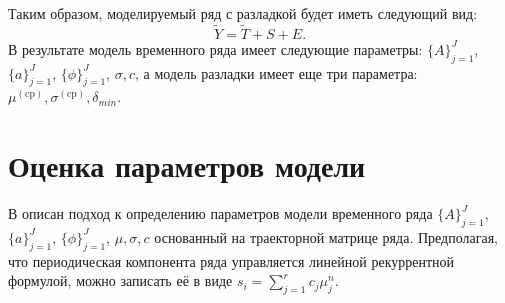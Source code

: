 \documentclass[%
12pt,
master,  %
natbib,      %
subf,        %
substylefile = spbu.rtx,
href,        %
colorlinks,  %
]{disser}
\begin{document}
%
Таким образом, моделируемый ряд с разладкой будет иметь следующий вид:
\begin{equation*}
\tilde{Y} = \tilde{T} + S + E. 
\end{equation*}
В результате модель временного ряда имеет следующие параметры: $ \{A\}_{j=1}^J$, $ \{a\}_{j=1}^J$, $ \{\phi\}_{j=1}^J$, $\sigma, c $, а модель разладки имеет еще три параметра: $ \mu^{\mathrm{(cp)}}, \sigma^{\mathrm{(cp)}}, \delta_{min} $.


\section{Оценка параметров модели}\label{section:parameters_estimation}

В  \cite{Golyandina2018}  описан подход к определению параметров модели временного ряда $ \{A\}_{j=1}^J$,  $\{a\}_{j=1}^J$,  $\{\phi\}_{j=1}^J$, $\mu, \sigma, c $ основанный на траекторной матрице ряда. Предполагая, что периодическая компонента ряда управляется линейной рекуррентной формулой, можно записать её в виде $s_i = \sum_{j=1}^r c_j \mu_j^n$. 

\end{document}
